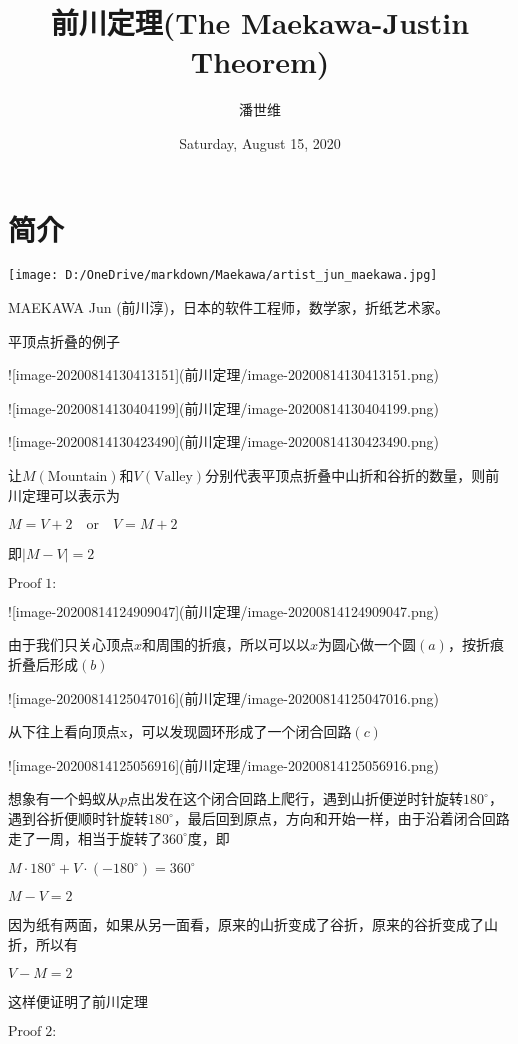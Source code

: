 \documentclass[a4paper,12pt]{article}
\begin{document}
\title {前川定理(The Maekawa-Justin Theorem)}
\author{潘世维}
\date{Saturday, August 15, 2020}
\maketitle
\section{简介} 
\texttt{[image: D:/OneDrive/markdown/Maekawa/artist\_jun\_maekawa.jpg]}

MAEKAWA Jun (前川淳)，日本的软件工程师，数学家，折纸艺术家。

平顶点折叠的例子

![image-20200814130413151](前川定理/image-20200814130413151.png)

![image-20200814130404199](前川定理/image-20200814130404199.png)

![image-20200814130423490](前川定理/image-20200814130423490.png)

让$M(\text{Mountain})$和$V(\text{Valley})$分别代表平顶点折叠中山折和谷折的数量，则前川定理可以表示为

$M = V +2 \quad \text{or}\quad V = M + 2$

即$|M-V|=2$

$\text{Proof}\;1:$

![image-20200814124909047](前川定理/image-20200814124909047.png)

由于我们只关心顶点$x$和周围的折痕，所以可以以$x$为圆心做一个圆$(a)$，按折痕折叠后形成$(b)$

![image-20200814125047016](前川定理/image-20200814125047016.png)

从下往上看向顶点x，可以发现圆环形成了一个闭合回路$(c)$

![image-20200814125056916](前川定理/image-20200814125056916.png)

想象有一个蚂蚁从$p$点出发在这个闭合回路上爬行，遇到山折便逆时针旋转$180^{\circ}$，遇到谷折便顺时针旋转$180^{\circ}$，最后回到原点，方向和开始一样，由于沿着闭合回路走了一周，相当于旋转了$360^{\circ}$度，即

$M · 180^{\circ} +V ·(−180^{\circ}) = 360^{\circ}$

$M − V = 2$

因为纸有两面，如果从另一面看，原来的山折变成了谷折，原来的谷折变成了山折，所以有

$V − M = 2$

这样便证明了前川定理

$\text{Proof}\;2:$
\end{document}
